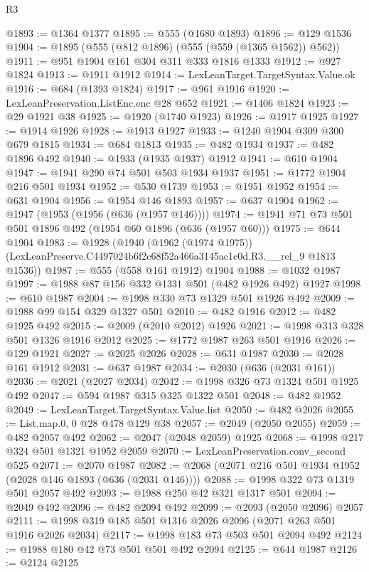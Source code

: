 \begin{lexlean}{R3}
\begin{coremodule}
@1893 := @1364 @1377
@1895 := @555 (@1680 @1893)
@1896 := @129 @1536
@1904 := @1895 (@555 (@812 @1896) (@555 (@559 (@1365 @1562)) @562))
@1911 := @951 @1904 @161 @304 @311 @333 @1816 @1333
@1912 := @927 @1824
@1913 := @1911 @1912
@1914 := LexLeanTarget.TargetSyntax.Value.ok
@1916 := @684 (@1393 @1824)
@1917 := @961 @1916
@1920 := LexLeanPreservation.ListEnc.enc @28 @652
@1921 := @1406 @1824
@1923 := @29 @1921 @38
@1925 := @1920 (@1740 @1923)
@1926 := @1917 @1925
@1927 := @1914 @1926
@1928 := @1913 @1927
@1933 := @1240 @1904 @309 @300 @679 @1815
@1934 := @684 @1813
@1935 := @482 @1934
@1937 := @482 @1896 @492
@1940 := @1933 (@1935 @1937) @1912
@1941 := @610 @1904
@1947 := @1941 @290 @74 @501 @503 @1934 @1937
@1951 := @1772 @1904 @216 @501 @1934
@1952 := @530 @1739
@1953 := @1951 @1952
@1954 := @631 @1904
@1956 := @1954 @146 @1893
@1957 := @637 @1904
@1962 := @1947 (@1953 (@1956 (@636 (@1957 @146))))
@1974 := @1941 @71 @73 @501 @501 @1896 @492 (@1954 @60 @1896 (@636 (@1957 @60)))
@1975 := @644 @1904
@1983 := @1928
    (@1940
      (@1962 (@1974 @1975))
      (LexLeanPreserve.C4497024b6f2c68f52a466a3145ac1c0d.R3.__rel_9 @1813 @1536))
@1987 := @555 (@558 @161 @1912) @1904
@1988 := @1032 @1987
@1997 := @1988 @87 @156 @332 @1331 @501 (@482 @1926 @492) @1927
@1998 := @610 @1987
@2004 := @1998 @330 @73 @1329 @501 @1926 @492
@2009 := @1988 @99 @154 @329 @1327 @501
@2010 := @482 @1916
@2012 := @482 @1925 @492
@2015 := @2009 (@2010 @2012) @1926
@2021 := @1998 @313 @328 @501 @1326 @1916 @2012
@2025 := @1772 @1987 @263 @501 @1916
@2026 := @129 @1921
@2027 := @2025 @2026
@2028 := @631 @1987
@2030 := @2028 @161 @1912
@2031 := @637 @1987
@2034 := @2030 (@636 (@2031 @161))
@2036 := @2021 (@2027 @2034)
@2042 := @1998 @326 @73 @1324 @501 @1925 @492
@2047 := @594 @1987 @315 @325 @1322 @501
@2048 := @482 @1952
@2049 := LexLeanTarget.TargetSyntax.Value.list
@2050 := @482 @2026
@2055 := List.map.{0, 0} @28 @478 @129 @38
@2057 := @2049 (@2050 @2055)
@2059 := @482 @2057 @492
@2062 := @2047 (@2048 @2059) @1925
@2068 := @1998 @217 @324 @501 @1321 @1952 @2059
@2070 := LexLeanPreservation.conv_second @525
@2071 := @2070 @1987
@2082 := @2068 (@2071 @216 @501 @1934 @1952 (@2028 @146 @1893 (@636 (@2031 @146))))
@2088 := @1998 @322 @73 @1319 @501 @2057 @492
@2093 := @1988 @250 @42 @321 @1317 @501
@2094 := @2049 @492
@2096 := @482 @2094 @492
@2099 := @2093 (@2050 @2096) @2057
@2111 := @1998 @319 @185 @501 @1316 @2026 @2096 (@2071 @263 @501 @1916 @2026 @2034)
@2117 := @1998 @183 @73 @503 @501 @2094 @492
@2124 := @1988 @180 @42 @73 @501 @501 @492 @2094
@2125 := @644 @1987
@2126 := @2124 @2125

\end{coremodule}
\end{lexlean}
